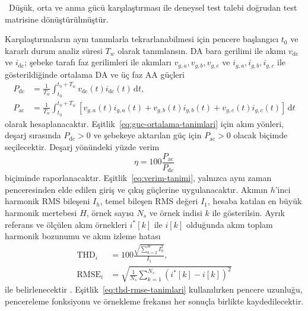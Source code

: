 \begin{center}
\juriistegietiketi\ \small Düşük, orta ve anma gücü karşılaştırması ile deneysel test talebi doğrudan test matrisine dönüştürülmüştür.
\end{center}

Karşılaştırmaların aynı tanımlarla tekrarlanabilmesi için pencere başlangıcı $t_0$ ve kararlı durum analiz süresi $T_w$ olarak tanımlansın. DA bara gerilimi ile akımı $v_{\mathrm{dc}}$ ve $i_{\mathrm{dc}}$; şebeke tarafı faz gerilimleri ile akımları $v_{g,a},v_{g,b},v_{g,c}$ ve $i_{g,a},i_{g,b},i_{g,c}$ ile gösterildiğinde ortalama DA ve üç faz AA güçleri
\begin{equation}
  \begin{aligned}
    P_{\mathrm{dc}} &= \frac{1}{T_w}\int_{t_0}^{t_0+T_w}v_{\mathrm{dc}}(t)i_{\mathrm{dc}}(t)\,\mathrm{d}t, \\
    P_{\mathrm{ac}} &= \frac{1}{T_w}\int_{t_0}^{t_0+T_w}\left[v_{g,a}(t)i_{g,a}(t)+v_{g,b}(t)i_{g,b}(t)+v_{g,c}(t)i_{g,c}(t)\right]\,\mathrm{d}t
  \end{aligned}
  \label{eq:guc-ortalama-tanimlari}
\end{equation}
olarak hesaplanacaktır. Eşitlik~\eqref{eq:guc-ortalama-tanimlari} için akım yönleri, deşarj sırasında $P_{\mathrm{dc}}>0$ ve şebekeye aktarılan güç için $P_{\mathrm{ac}}>0$ olacak biçimde seçilecektir. Deşarj yönündeki yüzde verim
\begin{equation}
  \eta=100\frac{P_{\mathrm{ac}}}{P_{\mathrm{dc}}}
  \label{eq:verim-tanimi}
\end{equation}
biçiminde raporlanacaktır. Eşitlik~\eqref{eq:verim-tanimi}, yalnızca aynı zaman penceresinden elde edilen giriş ve çıkış güçlerine uygulanacaktır. Akımın $h$'inci harmonik RMS bileşeni $I_h$, temel bileşen RMS değeri $I_1$, hesaba katılan en büyük harmonik mertebesi $H$, örnek sayısı $N_s$ ve örnek indisi $k$ ile gösterilsin. Ayrık referans ve ölçülen akım örnekleri $i^{\ast}[k]$ ile $i[k]$ olduğunda akım toplam harmonik bozunumu ve akım izleme hatası
\begin{equation}
  \begin{aligned}
    \mathrm{THD}_i &=100\frac{\sqrt{\sum_{h=2}^{H}I_h^2}}{I_1}, \\
    \mathrm{RMSE}_i&=\sqrt{\frac{1}{N_s}\sum_{k=1}^{N_s}\left(i^{\ast}[k]-i[k]\right)^2}
  \end{aligned}
  \label{eq:thd-rmse-tanimlari}
\end{equation}
ile belirlenecektir \citep{Teodorescu2011,IEC61000}. Eşitlik~\eqref{eq:thd-rmse-tanimlari} kullanılırken pencere uzunluğu, pencereleme fonksiyonu ve örnekleme frekansı her sonuçla birlikte kaydedilecektir.


